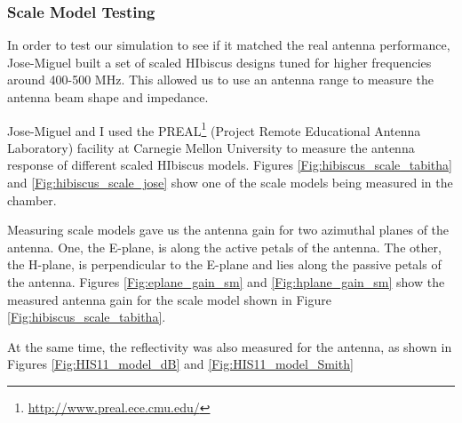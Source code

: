 \subsubsection{Scale Model Testing}
In order to test our simulation to see if it matched the real antenna performance, Jose-Miguel built a set of scaled HIbiscus designs tuned for higher frequencies around 400-500 MHz. This allowed us to use an antenna range to measure the antenna beam shape and impedance. 

Jose-Miguel and I used the PREAL\footnote{\url{http://www.preal.ece.cmu.edu/}} (Project Remote Educational Antenna Laboratory) facility at Carnegie Mellon University to measure the antenna response of different scaled HIbiscus models. Figures \ref{Fig:hibiscus_scale_tabitha} and \ref{Fig:hibiscus_scale_jose} show one of the scale models being measured in the chamber.

Measuring scale models gave us the antenna gain for two azimuthal planes of the antenna. One, the E-plane, is along the active petals of the antenna. The other, the H-plane, is perpendicular to the E-plane and lies along the passive petals of the antenna. Figures \ref{Fig:eplane_gain_sm} and \ref{Fig:hplane_gain_sm} show the measured antenna gain for the scale model shown in Figure \ref{Fig:hibiscus_scale_tabitha}. 

At the same time, the reflectivity was also measured for the antenna, as shown in Figures \ref{Fig:HIS11_model_dB} and \ref{Fig:HIS11_model_Smith}

